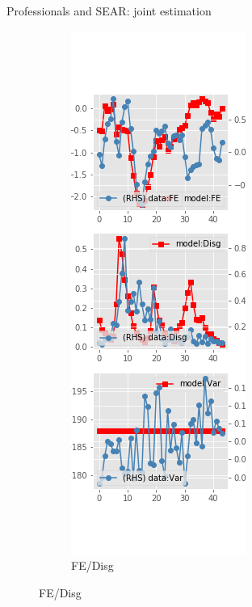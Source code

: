 \documentclass{beamer}
\begin{document}
\begin{frame}{Professionals and SEAR: joint estimation}
\begin{figure}[ht]
\begin{subfigure}[b]{0.2\textwidth}
		\end{subfigure}
		\hfill
		\begin{subfigure}[b]{0.2\textwidth}
			\caption{FE/Disg}
			\includegraphics[width=\textwidth, height = 0.8\textheight]{figuresDraft/spf_se_est_joint_diag2.png}
		\end{subfigure}
	\end{figure}
\end{frame}
\end{document}
